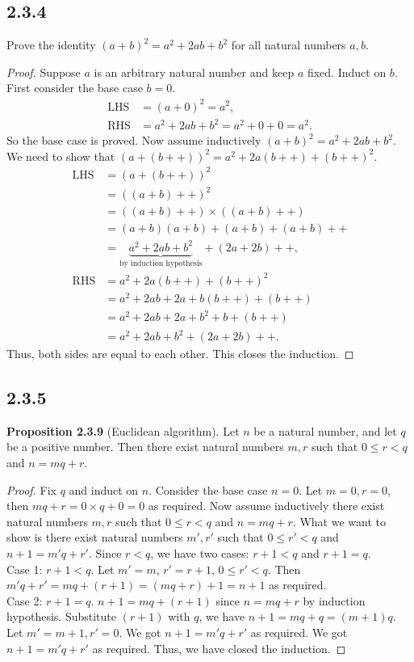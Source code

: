 \documentclass[12pt, letter]{article}
\begin{document}
\subsection*{2.3.4}
Prove the identity $(a+b)^2=a^2+2ab+b^2$ for all natural numbers $a,b$.
\begin{proof}
    Suppose $a$ is an arbitrary natural number and keep $a$ fixed. Induct on $b$. First consider the base case $b=0$. 
    \begin{equation*}
        \begin{aligned}
            \text{LHS}&=(a+0)^2=a^2,\\
            \text{RHS}&=a^2+2ab+b^2=a^2+0+0=a^2.
        \end{aligned}
    \end{equation*}
    So the base case is proved. Now assume inductively $(a+b)^2=a^2+2ab+b^2$. We need to show that $(a+(b++))^2=a^2+2a(b++)+(b++)^2$.
    \begin{equation*}
        \begin{aligned}
            \text{LHS}&=(a+(b++))^2\\&=((a+b)++)^2\\
            &=((a+b)++)\times((a+b)++)\\
            &=(a+b)(a+b)+(a+b)+(a+b)++\\
            &=\underbrace{a^2+2ab+b^2}_{\text{by induction hypothesis}}+(2a+2b)++,\\
            \text{RHS}&=a^2+2a(b++)+(b++)^2\\
            &=a^2+2ab+2a+b(b++)+(b++)\\
            &=a^2+2ab+2a+b^2+b+(b++)\\
            &=a^2+2ab+b^2+(2a+2b)++.
        \end{aligned}
    \end{equation*}
    Thus, both sides are equal to each other. This closes the induction.
\end{proof}
\subsection*{2.3.5}
\textbf{Proposition 2.3.9} (Euclidean algorithm). Let $n$ be a natural number, and let $q$ be a positive number. Then there exist natural numbers $m,r$ such that 
$0\leq r<q$ and $n=mq+r$.
\begin{proof}
    Fix $q$ and induct on $n$. Consider the base case $n=0$. Let $m=0,r=0$, then $mq+r=0\times q+0=0$ as required. Now assume inductively there exist natural numbers $m,r$ such that 
    $0\leq r<q$ and $n=mq+r$. What we want to show is there exist natural numbers $m',r'$ such that $0\leq r'<q$ and $n+1=m'q+r'$. Since $r<q$, we have two cases: $r+1<q$ and $r+1=q$. \\
    Case 1: $r+1<q$. Let $m'=m$, $r'=r+1$, $0\leq r'<q$. Then $m'q+r'=mq+(r+1)=(mq+r)+1=n+1$ as required. \\
    Case 2: $r+1=q$. $n+1=mq+(r+1)$ since $n=mq+r$ by induction hypothesis. Substitute $(r+1)$ with $q$, we have $n+1=mq+q=(m+1)q$. Let $m'=m+1,r'=0$. We got $n+1=m'q+r'$ as required.  
    We got $n+1=m'q+r'$ as required. Thus, we have closed the induction.
\end{proof}
\end{document}
